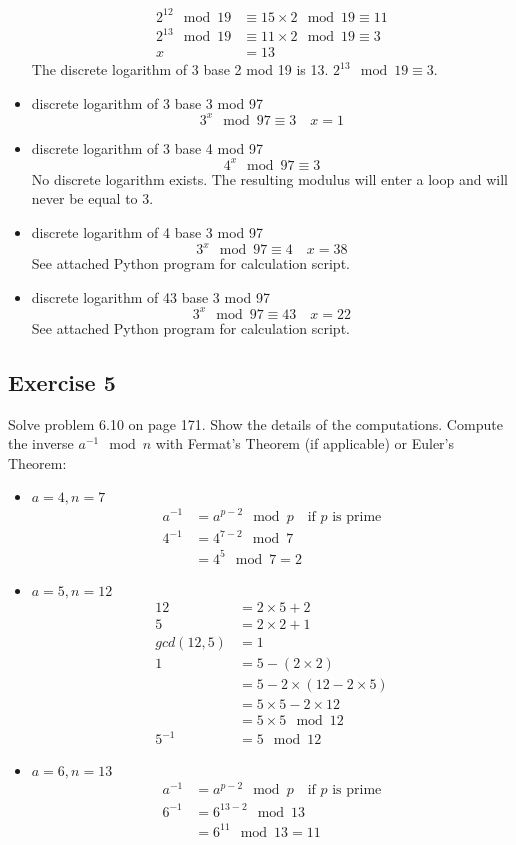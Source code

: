 \documentclass{math}
\begin{document}
\begin{itemize}
\begin{align*}
    2^{12}\mod19 &\equiv 15\times2\mod19 \equiv 11 \\
    2^{13}\mod19 &\equiv 11\times2\mod19 \equiv 3 \\
    x &= 13
  \end{align*}
  The discrete logarithm of 3 base 2 mod 19 is 13. \( 2^{13}\mod19 \equiv 3 \).
  \item discrete logarithm of 3 base 3 mod 97
  \[ 3^x\mod97 \equiv 3 \quad x = 1 \]
  \item discrete logarithm of 3 base 4 mod 97
  \[ 4^x\mod97 \equiv 3 \]
  No discrete logarithm exists. The resulting modulus will enter a loop and
  will never be equal to 3.
  \item discrete logarithm of 4 base 3 mod 97
  \[ 3^x\mod97 \equiv 4 \quad x = 38 \]
  See attached Python program for calculation script.
  \item discrete logarithm of 43 base 3 mod 97
  \[ 3^x\mod97 \equiv 43 \quad x = 22 \]
  See attached Python program for calculation script.
\end{itemize}

\subsection*{Exercise 5}
Solve problem 6.10 on page 171. Show the details of the computations. Compute
the inverse \( a^{-1}\mod n \) with Fermat's Theorem (if applicable) or
Euler's Theorem:
\begin{itemize}
  \item \( a = 4, n = 7 \)
  \begin{align*}
    a^{-1} &= a^{p-2}\mod p \quad\text{if } p \text{ is prime} \\
    4^{-1} &= 4^{7-2}\mod7 \\
    &= 4^5\mod7 = 2
  \end{align*}
  \item \( a = 5, n = 12 \)
  \begin{align*}
    12 &= 2\times5+2 \\
    5 &= 2\times2+1 \\
    gcd(12,5) &= 1 \\
    1 &= 5-(2\times2) \\
    &= 5-2\times(12-2\times5) \\
    &= 5\times5-2\times12 \\
    &= 5\times5\mod12 \\
    5^{-1} &= 5\mod12
  \end{align*}
  \item \( a = 6, n = 13 \)
  \begin{align*}
    a^{-1} &= a^{p-2}\mod p \quad\text{if } p \text{ is prime} \\
    6^{-1} &= 6^{13-2}\mod13 \\
    &= 6^{11}\mod13 = 11
  \end{align*}
\end{itemize}
\end{document}
